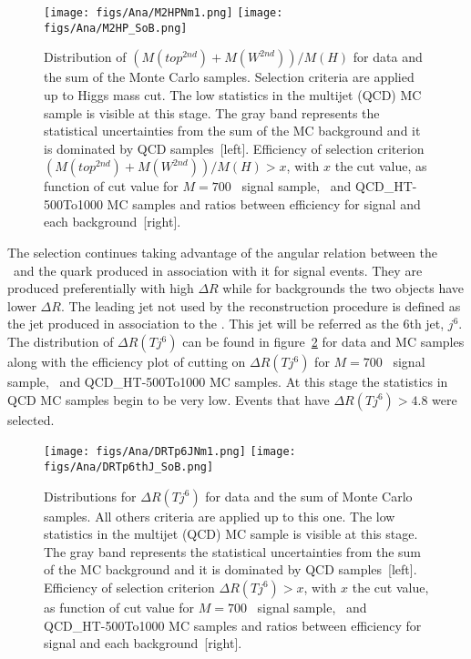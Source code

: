 \begin{figure}[!Hhtbp]
  \begin{center}
    \texttt{[image: figs/Ana/M2HPNm1.png]}
    \texttt{[image: figs/Ana/M2HP\_SoB.png]}
    \caption{Distribution of $(M(top^{2nd})+M(W^{2nd}))/M(H)$ for data and the sum of the Monte Carlo samples. Selection criteria are applied up to Higgs mass cut. The low statistics in the multijet (QCD) MC sample is visible at this stage. The gray band represents the statistical uncertainties from the sum of the MC background and it is dominated by QCD samples~[left]. Efficiency of selection criterion $(M(top^{2nd})+M(W^{2nd}))/M(H)>x$, with $x$ the cut value, as function of cut value for $M=700$ \GeVcc~signal sample, \ttbar~and QCD\_HT-500To1000 MC samples and ratios between efficiency for signal and each background~[right].}
    \label{fig:m2thp}
  \end{center}
\end{figure}

The selection continues taking advantage of the angular relation between the \Tp~and the quark produced in association with it for signal events. They are produced preferentially with high $\Delta R$ while for backgrounds the two objects have lower $\Delta R$. The leading jet not used by the reconstruction procedure is defined as the jet produced in association to the \Tp. This jet will be referred as the 6th jet, $j^{6}$. The distribution of $\Delta R (T j^{6})$ can be found in figure~\ref{fig:jet6} for data and MC samples along with the efficiency plot of cutting on $\Delta R (T j^{6})$ for $M=700$ \GeVcc~signal sample, \ttbar~and QCD\_HT-500To1000 MC samples. At this stage the statistics in QCD MC samples begin to be very low. Events that have $\Delta R (T j^{6})>4.8$ were selected. 

\begin{figure}[!Hhtbp]
  \begin{center}
    \texttt{[image: figs/Ana/DRTp6JNm1.png]}
    \texttt{[image: figs/Ana/DRTp6thJ\_SoB.png]}
    \caption{Distributions for $\Delta R (T j^{6})$  for data and the sum of Monte Carlo samples. All others criteria are applied up to this one. The low statistics in the multijet (QCD) MC sample is visible at this stage. The gray band represents the statistical uncertainties from the sum of the MC background and it is dominated by QCD samples~[left]. Efficiency of selection criterion $\Delta R (T j^{6})>x$, with $x$ the cut value, as function of cut value for $M=700$ \GeVcc~signal sample, \ttbar~and QCD\_HT-500To1000 MC samples and ratios between efficiency for signal and each background~[right].}
    \label{fig:jet6}
  \end{center}
\end{figure}

